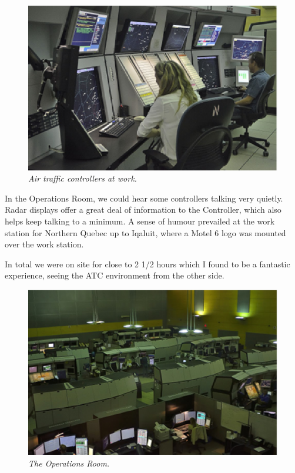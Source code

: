 \begin{figure}[htbp]
   \vspace{2em}
   \centering
   \includegraphics[scale=0.5]{yul_tca2.eps}
   \caption*{\small \em Air traffic controllers at work.}
   \label{fig:tca2}
\end{figure}

In the Operations Room, we could hear some controllers talking very
quietly. Radar displays offer a great deal of information to the
Controller, which also helps keep talking to a minimum. A sense of
humour prevailed at the work station for Northern Quebec up to
Iqaluit, where a Motel 6 logo was mounted over the work station.

In total we were on site for close to 2 1/2 hours which I found to be
a fantastic experience, seeing the ATC environment from the other
side.

\begin{figure}[htbp]
   \vspace{2em}
   \centering
   \includegraphics[scale=0.5]{yul_tca1.eps}
   \caption*{\small \em The Operations Room.}
   \label{fig:tca1}
\end{figure}

